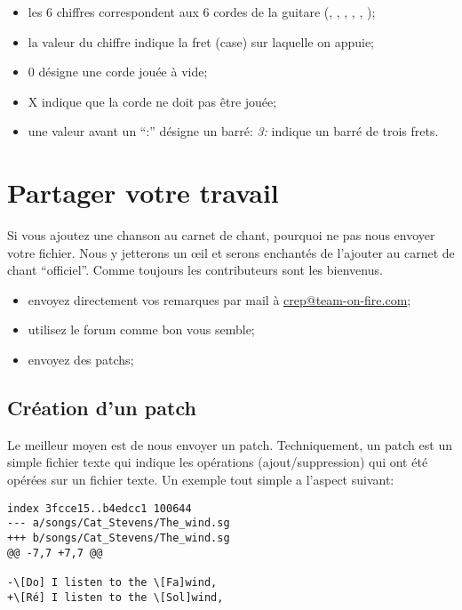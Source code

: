 \documentclass[versionenligne]{framabook}
\begin{document}
\begin{itemize}
\item les 6 chiffres correspondent aux 6 cordes de la
  guitare (, , , , , );
\item la valeur du chiffre indique la fret (case) sur laquelle on
  appuie;
\item 0 désigne une corde jouée à vide;
\item X indique que la corde ne doit pas être jouée;
\item une valeur avant un ``:'' désigne un barré: \emph{3:} indique
  un barré de trois frets.
\end{itemize}


\section{Partager votre travail}

Si vous ajoutez une chanson au carnet de chant, pourquoi ne pas nous
envoyer votre fichier. Nous y jetterons un \oe{}il et serons enchantés
de l'ajouter au carnet de chant ``officiel''. Comme toujours les
contributeurs sont les bienvenus.

\begin{itemize}
\item envoyez directement vos remarques par mail à
  \url{crep@team-on-fire.com};
\item utilisez le forum comme bon vous semble;
\item envoyez des patchs;
\end{itemize}

\subsection{Création d'un patch}

Le meilleur moyen est de nous envoyer un patch. Techniquement, un
patch est un simple fichier texte qui indique les opérations
(ajout/suppression) qui ont été opérées sur un fichier texte. Un
exemple tout simple a l'aspect suivant:

\begin{verbatim}
index 3fcce15..b4edcc1 100644
--- a/songs/Cat_Stevens/The_wind.sg
+++ b/songs/Cat_Stevens/The_wind.sg
@@ -7,7 +7,7 @@

-\[Do] I listen to the \[Fa]wind,
+\[Ré] I listen to the \[Sol]wind,
\end{verbatim}
\end{document}

